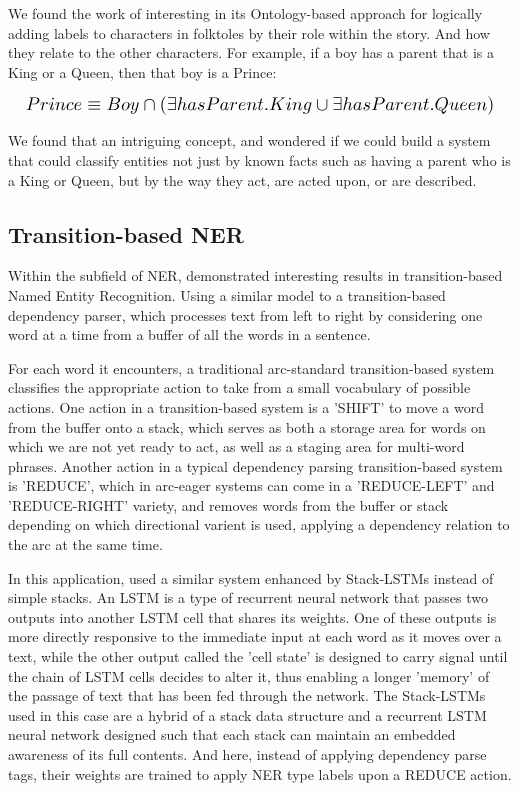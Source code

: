 \documentclass[11pt,a4paper]{article}
\begin{document}
We found the work of \citet{SuciuInterleavingontologybasedreasoning2014} interesting in its Ontology-based approach for logically adding labels to characters in folktoles by their role within the story. And how they relate to the other characters. For example, if a boy has a parent that is a King or a Queen, then that boy is a Prince:

\begin{equation}
\resizebox{\linewidth}{!} 
  {
    $ Prince \equiv Boy \cap (\exists hasParent.King \cup \exists hasParent.Queen) $
  }
\end{equation}

We found that an intriguing concept, and wondered if we could build a system that could classify entities not just by known facts such as having a parent who is a King or Queen, but by the way they act, are acted upon, or are described.

\subsection{Transition-based NER}

Within the subfield of NER, \citet{LampleNeuralArchitecturesNamed2016} demonstrated interesting results in transition-based Named Entity Recognition. Using a similar model to a transition-based dependency parser, which processes text from left to right by considering one word at a time from a buffer of all the words in a sentence.

For each word it encounters, a traditional arc-standard transition-based system \cite{NivreIncrementalityDeterministicDependency2004} classifies the appropriate action to take from a small vocabulary of possible actions. One action in a transition-based system is a 'SHIFT' to move a word from the buffer onto a stack, which serves as both a storage area for words on which we are not yet ready to act, as well as a staging area for multi-word phrases. Another action in a typical dependency parsing transition-based system is 'REDUCE', which in arc-eager systems can come in a 'REDUCE-LEFT' and 'REDUCE-RIGHT' variety, and removes words from the buffer or stack depending on which directional varient is used, applying a dependency relation to the arc at the same time.

In this application, \citet{LampleNeuralArchitecturesNamed2016} used a similar system enhanced by Stack-LSTMs\cite{DyerTransitionBasedDependencyParsing2015} instead of simple stacks. An LSTM is a type of recurrent neural network that passes two outputs into another LSTM cell that shares its weights. One of these outputs is more directly responsive to the immediate input at each word as it moves over a text, while the other output called the 'cell state' is designed to carry signal until the chain of LSTM cells decides to alter it, thus enabling a longer 'memory' of the passage of text that has been fed through the network. The Stack-LSTMs used in this case are a hybrid of a stack data structure and a recurrent LSTM neural network designed such that each stack can maintain an embedded awareness of its full contents. And here, instead of applying dependency parse tags, their weights are trained to apply NER type labels upon a REDUCE action.
\end{document}
